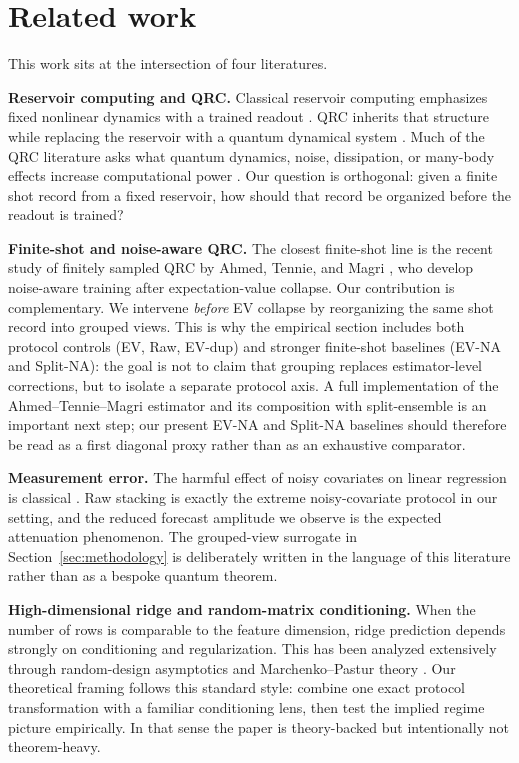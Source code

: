 \section{Related work}
\label{sec:related}

This work sits at the intersection of four literatures.

\textbf{Reservoir computing and QRC.} Classical reservoir computing emphasizes fixed nonlinear dynamics with a trained readout \cite{maass2002real,lukosevicius2009reservoir,tanaka2019recent}. QRC inherits that structure while replacing the reservoir with a quantum dynamical system \cite{fujii2017harnessing,nakajima2019boosting,mujal2021opportunities}. Much of the QRC literature asks what quantum dynamics, noise, dissipation, or many-body effects increase computational power \cite{kubota2022noise,kubota2023temporal,fry2023optimizing,domingo2023taking,sannia2024dissipation,martinez2021dynamical,palacios2024role}. Our question is orthogonal: given a finite shot record from a fixed reservoir, how should that record be organized before the readout is trained?

\textbf{Finite-shot and noise-aware QRC.} The closest finite-shot line is the recent study of finitely sampled QRC by Ahmed, Tennie, and Magri \cite{ahmed2025optimal}, who develop noise-aware training after expectation-value collapse. Our contribution is complementary. We intervene \emph{before} EV collapse by reorganizing the same shot record into grouped views. This is why the empirical section includes both protocol controls (EV, Raw, EV-dup) and stronger finite-shot baselines (EV-NA and Split-NA): the goal is not to claim that grouping replaces estimator-level corrections, but to isolate a separate protocol axis. A full implementation of the Ahmed--Tennie--Magri estimator and its composition with split-ensemble is an important next step; our present EV-NA and Split-NA baselines should therefore be read as a first diagonal proxy rather than as an exhaustive comparator.

\textbf{Measurement error.} The harmful effect of noisy covariates on linear regression is classical \cite{fuller1987measurement,carroll2006measurement}. Raw stacking is exactly the extreme noisy-covariate protocol in our setting, and the reduced forecast amplitude we observe is the expected attenuation phenomenon. The grouped-view surrogate in Section~\ref{sec:methodology} is deliberately written in the language of this literature rather than as a bespoke quantum theorem.

\textbf{High-dimensional ridge and random-matrix conditioning.} When the number of rows is comparable to the feature dimension, ridge prediction depends strongly on conditioning and regularization. This has been analyzed extensively through random-design asymptotics and Marchenko--Pastur theory \cite{marchenko1967distribution,bai2010spectral,hsu2012random,dobriban2018high}. Our theoretical framing follows this standard style: combine one exact protocol transformation with a familiar conditioning lens, then test the implied regime picture empirically. In that sense the paper is theory-backed but intentionally not theorem-heavy.
